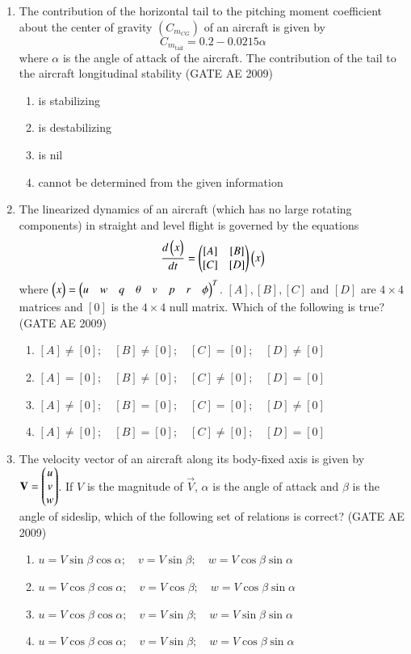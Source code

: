 \documentclass[journal,12pt,onecolumn]{IEEEtran}
\theoremstyle{remark}
\begin{document}
\begin{flushleft}
\begin{enumerate}
\item 
The contribution of the horizontal tail to the pitching moment coefficient about the center of gravity \((C_{m_{CG}})\) of an aircraft is given by  
\[
C_{m_{\text{tail}}} = 0.2 - 0.0215 \alpha
\]  
where \(\alpha\) is the angle of attack of the aircraft. The contribution of the tail to the aircraft longitudinal stability  
\hfill(GATE AE 2009)

\begin{enumerate}
\item is stabilizing
\item is destabilizing
\item is nil
\item cannot be determined from the given information
\end{enumerate}


\item 
The linearized dynamics of an aircraft (which has no large rotating components) in straight and level flight is governed by the equations
\[
\frac{d\begin{pmatrix}x\end{pmatrix}}{dt} = \begin{pmatrix}
[A] & [B] \\
[C] & [D]
\end{pmatrix} \begin{pmatrix}x\end{pmatrix}
\]
where \(\begin{pmatrix}x\end{pmatrix} = \begin{pmatrix}u & w & q & \theta & v & p & r & \phi\end{pmatrix}^T\). \([A], [B], [C]\) and \([D]\) are \(4 \times 4\) matrices and \([0]\) is the \(4 \times 4\) null matrix. Which of the following is true?  
\hfill(GATE AE 2009)
\begin{enumerate}
\item \([A] \neq [0]; \quad [B] \neq [0]; \quad [C] = [0]; \quad [D] \neq [0]\)
\item \([A] = [0]; \quad [B] \neq [0]; \quad [C] \neq [0]; \quad [D] = [0]\)
\item \([A] \neq [0]; \quad [B] = [0]; \quad [C] = [0]; \quad [D] \neq [0]\)
\item \([A] \neq [0]; \quad [B] = [0]; \quad [C] \neq [0]; \quad [D] = [0]\)
\end{enumerate}

\item 
The velocity vector of an aircraft along its body-fixed axis is given by \(\mathbf{V} = \begin{pmatrix}u \\ v \\ w\end{pmatrix}\). If \(V\) is the magnitude of \(\vec{V}\), \(\alpha\) is the angle of attack and \(\beta\) is the angle of sideslip, which of the following set of relations is correct?  
\hfill(GATE AE 2009)
\begin{multicols}{2}
\begin{enumerate}
\item \( u = V \sin \beta \cos \alpha;\quad v = V \sin \beta;\quad w = V \cos \beta \sin \alpha \)
\item \( u = V \cos \beta \cos \alpha;\quad v = V \cos \beta;\quad w = V \cos \beta \sin \alpha \)
\item \( u = V \cos \beta \cos \alpha;\quad v = V \sin \beta;\quad w = V \sin \beta \sin \alpha \)
\item \( u = V \cos \beta \cos \alpha;\quad v = V \sin \beta;\quad w = V \cos \beta \sin \alpha \)
\end{enumerate}
\end{multicols}


\end{enumerate}
\end{flushleft}
\end{document}
